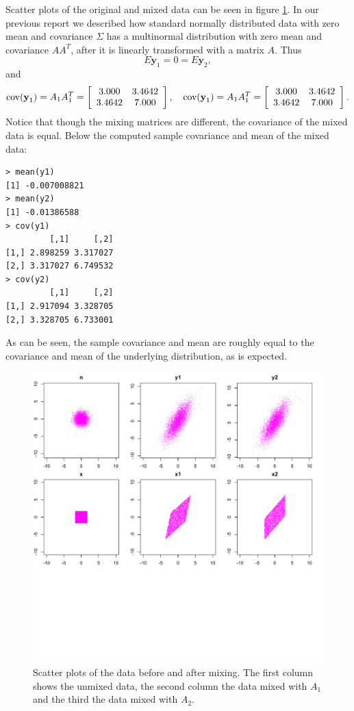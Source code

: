\documentclass{article}
\begin{document}
Scatter plots of the original and mixed data can be seen in figure
\ref{fig:scatterE21}. In our previous report we described how standard
normally distributed data with zero mean and covariance $\Sigma$ has a
multinormal distribution with zero mean and covariance $AA^T$, after
it is linearly transformed with a matrix $A$. Thus 
\[
E \textbf{y}_1 = 0 = E \textbf{y}_2,
\]
and 
\[
\textup{cov}(\textbf{y}_1) = A_1A_1^T = \left[ \begin{array}{ccc}
3.000 & 3.4642  \\
3.4642 & 7.000  \end{array} \right], \quad
\textup{cov}(\textbf{y}_1) = A_1A_1^T = \left[ \begin{array}{ccc}
3.000 & 3.4642  \\
3.4642 & 7.000  \end{array} \right].
\] 
Notice that though the mixing matrices are different, the covariance
of the mixed data is equal. Below the computed sample covariance and mean of the mixed data:
\begin{verbatim}
> mean(y1)
[1] -0.007008821
> mean(y2)
[1] -0.01386588
> cov(y1)
         [,1]     [,2]
[1,] 2.898259 3.317027
[2,] 3.317027 6.749532
> cov(y2)
         [,1]     [,2]
[1,] 2.917094 3.328705
[2,] 3.328705 6.733001
\end{verbatim}
As can be seen, the sample covariance and mean are roughly equal to the covariance and mean of the
underlying distribution, as is expected.

\begin{figure}\centering
	\includegraphics[trim = 0cm 5.9cm 0cm 0cm, clip = true,
totalheight=0.5\textheight]{scatterPlotE21.pdf}
	\caption{Scatter plots of the data before and after
          mixing. The first column shows the unmixed data, the second column
          the data mixed with $A_1$ and the third the data mixed with $A_2$.} \label{fig:scatterE21}
\end{figure}
\end{document}
